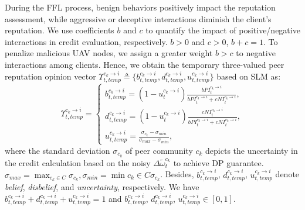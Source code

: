 \documentclass[lettersize,journal]{IEEEtran}
\begin{document}
During the FFL process, benign behaviors positively impact the reputation assessment, while aggressive or deceptive interactions diminish the client's reputation. We use coefficients $b$ and $c$ to quantify the impact of positive/negative interactions in credit evaluation, respectively. $b>0$ and $c>0$, $b+c=1$. To penalize malicious UAV nodes, we assign a greater weight $b>c$ to negative interactions among clients. 
Hence, we obtain the temporary three-valued peer reputation opinion \cite{liu2019trust} vector $\Upsilon^{c_k \rightarrow i}_{t,temp}\triangleq \{b^{c_k \rightarrow i}_{t,temp}, d^{c_k \rightarrow i}_{t,temp}, u^{c_k \rightarrow i}_{t,temp}\}$ based on SLM as:
\begin{equation}
\Upsilon^{c_k \rightarrow i}_{t,temp}=
\left  \{
      \begin{array}{ll}%
        b^{c_k \rightarrow i}_{t,temp}=(1-u^{c_k \rightarrow i}_{t})\frac{bPI^{c_k \rightarrow i}_{t}}{ bPI^{c_k \rightarrow i}_{t}+cNI^{c_k \rightarrow i}_{t}},\\
        d^{c_k \rightarrow i}_{t,temp}=(1-u^{c_k \rightarrow i}_{t})\frac{cNI^{c_k \rightarrow i}_{t}}{ bPI^{c_k \rightarrow i}_{t}+cNI^{c_k \rightarrow i}_{t}},\\
        u^{c_k \rightarrow i}_{t,temp}=\frac{\sigma_{c_k}-\sigma_{min}}{\sigma_{max}-\sigma_{min}},                
    \end{array}
\right.
\end{equation}
where the standard deviation $ \sigma_{c_k}$ of peer community $c_k$ depicts the uncertainty in the credit calculation based on the noisy $\Delta\widetilde{\omega}^{c_k}_{t}$ to achieve DP guarantee. $ \sigma_{max}=\max_{c_k \in C}{\sigma_{c_k}}, \sigma_{min}=\min{c_k \in C}{\sigma_{c_k}}$. %
Besides, $b^{c_k \rightarrow i}_{t,temp}$, $d^{c_k \rightarrow i}_{t,temp}$, $u^{c_k \rightarrow i}_{t,temp}$ denote \textit{belief}, \textit{disbelief}, and \textit{uncertainty}, respectively. We have $b^{c_k \rightarrow i}_{t,temp}+d^{c_k \rightarrow i}_{t,temp}+u^{c_k \rightarrow i}_{t,temp}=1$ and $b^{c_k \rightarrow i}_{t,temp}$, $d^{c_k \rightarrow i}_{t,temp}$, $u^{c_k \rightarrow i}_{t,temp} \in [0,1]$.
\end{document}
